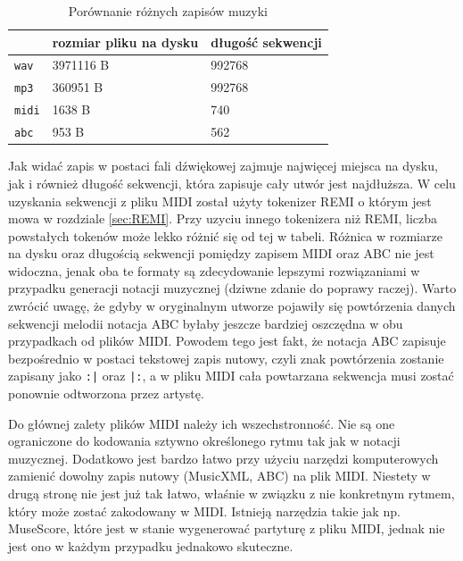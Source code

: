 \documentclass[data-science]{agh-wi} %
\begin{document}
\begin{table}[ht!]
    \centering
    \begin{tabular}{|l|l|l|}
        \hline
                      & rozmiar pliku na dysku & długość sekwencji \\ \hline
        \texttt{wav}  & 3971116 B              & 992768            \\ \hline
        \texttt{mp3}  & 360951 B               & 992768            \\ \hline
        \texttt{midi} & 1638 B                 & 740               \\ \hline
        \texttt{abc}  & 953 B                  & 562               \\ \hline
    \end{tabular}
    \caption{Porównanie różnych zapisów muzyki}\label{tab:music_diff}
\end{table}

Jak widać zapis w postaci fali dźwiękowej zajmuje najwięcej miejsca na dysku, jak i również długość sekwencji, która zapisuje cały utwór jest najdłuższa. W celu uzyskania sekwencji z pliku MIDI został użyty tokenizer REMI o którym jest mowa w rozdziale \ref*{sec:REMI}. Przy uzyciu innego tokenizera niż REMI, liczba powstałych tokenów może lekko różnić się od tej w tabeli. Różnica w rozmiarze na dysku oraz długością sekwencji pomiędzy zapisem MIDI oraz ABC nie jest widoczna, jenak oba te formaty są zdecydowanie lepszymi rozwiązaniami w przypadku generacji notacji muzycznej (dziwne zdanie do poprawy raczej). Warto zwrócić uwagę, że gdyby w oryginalnym utworze pojawiły się powtórzenia danych sekwencji melodii notacja ABC byłaby jeszcze bardziej oszczędna w obu przypadkach od plików MIDI.  Powodem tego jest fakt, że notacja ABC zapisuje bezpośrednio w postaci tekstowej zapis nutowy, czyli znak powtórzenia zostanie zapisany jako \texttt{:|} oraz \texttt{|:}, a w pliku MIDI cała powtarzana sekwencja musi zostać ponownie odtworzona przez artystę.

Do głównej zalety plików MIDI należy ich wszechstronność. Nie są one ograniczone do kodowania sztywno określonego rytmu tak jak w notacji muzycznej. Dodatkowo jest bardzo łatwo przy użyciu narzędzi komputerowych zamienić dowolny zapis nutowy (MusicXML, ABC) na plik MIDI. Niestety w drugą stronę nie jest już tak łatwo, właśnie w związku z nie konkretnym rytmem, który może zostać zakodowany w MIDI. Istnieją narzędzia takie jak np. MuseScore, które jest w stanie wygenerować partyturę z pliku MIDI, jednak nie jest ono w każdym przypadku jednakowo skuteczne.
\end{document}
